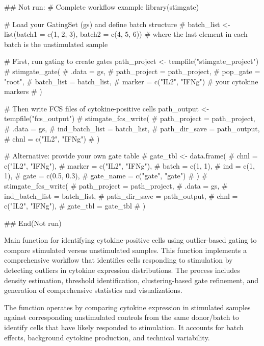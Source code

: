 \documentclass[letterpaper]{book}
\begin{document}
%
\begin{Examples}
\begin{ExampleCode}
## Not run: 
# Complete workflow example
library(stimgate)

# Load your GatingSet (gs) and define batch structure
# batch_list <- list(batch1 = c(1, 2, 3), batch2 = c(4, 5, 6))
# where the last element in each batch is the unstimulated sample

# First, run gating to create gates
path_project <- tempfile("stimgate_project")
# stimgate_gate(
#   .data = gs,
#   path_project = path_project,
#   pop_gate = "root",
#   batch_list = batch_list,
#   marker = c("IL2", "IFNg")  # your cytokine markers
# )

# Then write FCS files of cytokine-positive cells
path_output <- tempfile("fcs_output")
# stimgate_fcs_write(
#   path_project = path_project,
#   .data = gs,
#   ind_batch_list = batch_list,
#   path_dir_save = path_output,
#   chnl = c("IL2", "IFNg")
# )

# Alternative: provide your own gate table
# gate_tbl <- data.frame(
#   chnl = c("IL2", "IFNg"),
#   marker = c("IL2", "IFNg"),
#   batch = c(1, 1),
#   ind = c(1, 1),
#   gate = c(0.5, 0.3),
#   gate_name = c("gate", "gate")
# )
# stimgate_fcs_write(
#   path_project = path_project,
#   .data = gs,
#   ind_batch_list = batch_list,
#   path_dir_save = path_output,
#   chnl = c("IL2", "IFNg"),
#   gate_tbl = gate_tbl
# )

## End(Not run)
\end{ExampleCode}
\end{Examples}
%
\begin{Description}
Main function for identifying cytokine-positive cells using outlier-based gating
to compare stimulated versus unstimulated samples. This function implements a
comprehensive workflow that identifies cells responding to stimulation by
detecting outliers in cytokine expression distributions. The process includes
density estimation, threshold identification, clustering-based gate refinement,
and generation of comprehensive statistics and visualizations.

The function operates by comparing cytokine expression in stimulated samples
against corresponding unstimulated controls from the same donor/batch to identify
cells that have likely responded to stimulation. It accounts for batch effects,
background cytokine production, and technical variability.
\end{Description}
\end{document}
